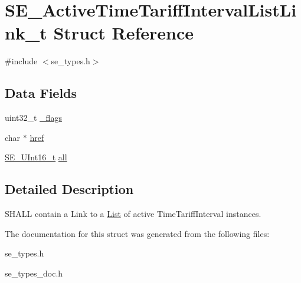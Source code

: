 \hypertarget{structSE__ActiveTimeTariffIntervalListLink__t}{}\section{S\+E\+\_\+\+Active\+Time\+Tariff\+Interval\+List\+Link\+\_\+t Struct Reference}
\label{structSE__ActiveTimeTariffIntervalListLink__t}


{\ttfamily \#include $<$se\+\_\+types.\+h$>$}

\subsection*{Data Fields}
\begin{DoxyCompactItemize}
\item 
uint32\+\_\+t \hyperlink{group__ActiveTimeTariffIntervalListLink_gae4afe7d01ef64164fb20d662e4447095}{\+\_\+flags}
\item 
char $\ast$ \hyperlink{group__ActiveTimeTariffIntervalListLink_ga1feb971d205d4f4f6e5fff8067e12a08}{href}
\item 
\hyperlink{group__UInt16_gac68d541f189538bfd30cfaa712d20d29}{S\+E\+\_\+\+U\+Int16\+\_\+t} \hyperlink{group__ActiveTimeTariffIntervalListLink_ga155419b00dbfbeda38b3b4a8a06f2b16}{all}
\end{DoxyCompactItemize}


\subsection{Detailed Description}
S\+H\+A\+LL contain a Link to a \hyperlink{structList}{List} of active Time\+Tariff\+Interval instances. 

The documentation for this struct was generated from the following files\+:\begin{DoxyCompactItemize}
\item 
se\+\_\+types.\+h\item 
se\+\_\+types\+\_\+doc.\+h\end{DoxyCompactItemize}
